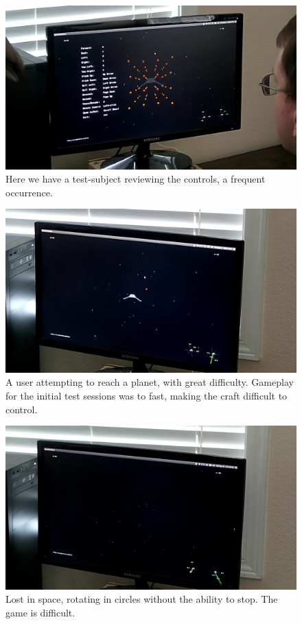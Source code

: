 \begin{figure}[H]
  \centering
  \includegraphics[width=1.0\textwidth]{images/ss1.jpg}
  \caption{Here we have a test-subject reviewing the controls, a frequent occurrence.}
\end{figure}

\begin{figure}[H]
  \centering
  \includegraphics[width=1.0\textwidth]{images/ss2.jpg}
  \caption{A user attempting to reach a planet, with great difficulty.  Gameplay for the initial test sessions was to fast, making the craft difficult to control.}
\end{figure}

\begin{figure}[H]
  \centering
  \includegraphics[width=1.0\textwidth]{images/ss3.jpg}
  \caption{Lost in space, rotating in circles without the ability to stop.  The game is difficult.}
\end{figure}

